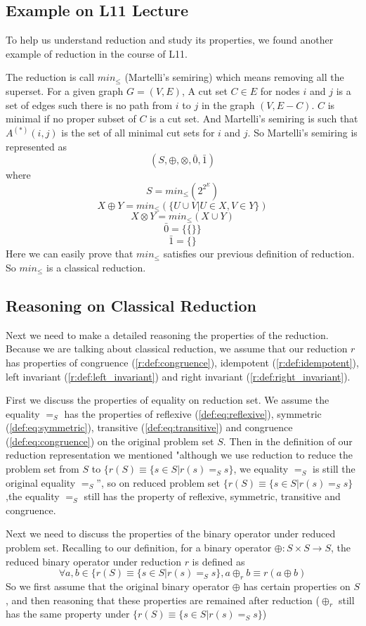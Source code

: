 \documentclass[a4paper,10pt]{article}
\begin{document}
\subsection{Example on L11 Lecture}
To help us understand reduction and study its properties, we found another example of reduction in the course of L11.

The reduction is call $min_{\leq}$ (Martelli’s semiring)\cite{martelli_gaussian_1976} which means removing all the superset.
For a given graph $G = (V,E)$, A cut set $C \in E$ for nodes $i$ and $j$ is a set of edges such there is no path from $i$ to $j$ in the graph $(V, E - C)$. $C$ is minimal if no proper subset of $C$ is a cut set. And Martelli’s semiring is such that $A^{(*)}(i, j)$ is the set of all minimal cut sets for $i$ and $j$. 
So Martelli’s semiring is represented as \[(S,\oplus,\otimes,\bar0,\bar1)\] where \[S = min_\leq(2^{2^E})\] \[X\oplus Y = min_\leq(\{U \cup V | U \in X, V \in Y\})\] \[X\otimes Y = min_\leq(X \cup Y)\] \[\bar0 = \{\{\}\}\] \[\bar1 = \{\}\]
Here we can easily prove that $min_\leq$ satisfies our previous definition of reduction. So $min_\leq$ is a classical reduction.
\subsection{Reasoning on Classical Reduction}
Next we need to make a detailed reasoning the properties of the reduction.
Because we are talking about classical reduction, we assume that our reduction $r$ has properties of congruence (\ref{r:def:congruence}), idempotent (\ref{r:def:idempotent}), left invariant (\ref{r:def:left_invariant}) and right invariant (\ref{r:def:right_invariant}).

First we discuss the properties of equality on reduction set. We assume the equality $=_S$ has the properties of reflexive (\ref{def:eq:reflexive}), symmetric (\ref{def:eq:symmetric}), transitive (\ref{def:eq:transitive}) and congruence (\ref{def:eq:congruence}) on the original problem set $S$.
Then in the definition of our reduction representation we mentioned "although we use reduction to reduce the problem set from $S$ to $\{r(S) \equiv \{s \in S | r(s) =_S s\} $, we equality $=_S$ is still the original equality $=_S$”, so on reduced problem set $\{r(S) \equiv \{s \in S | r(s) =_S s\}$ ,the equality $=_S$ still has the property of reflexive, symmetric, transitive and congruence.

Next we need to discuss the properties of the binary operator under reduced problem set. 
Recalling to our definition, for a binary operator $\oplus : S \times S \rightarrow S$, the reduced binary operator under reduction $r$ is defined as \[\forall a, b \in \{r(S) \equiv \{s \in S | r(s) =_S s\}, a \oplus_r b \equiv r(a \oplus b)\]
So we first assume that the original binary operator $\oplus$ has certain properties on $S$, and then reasoning that these properties are remained after reduction ($\oplus_r$ still has the same property under $\{r(S) \equiv \{s \in S | r(s) =_S s\}$)
\end{document}
